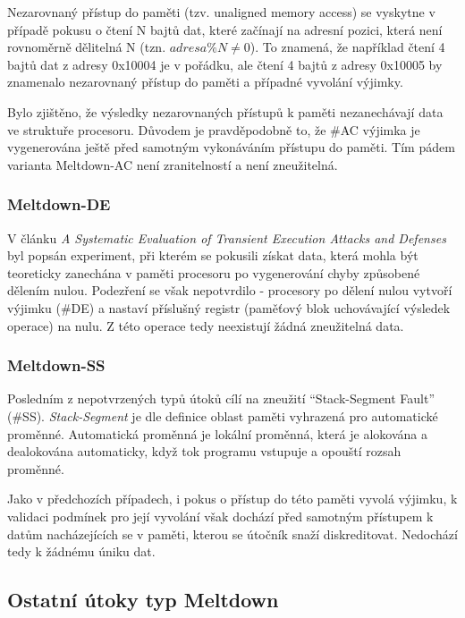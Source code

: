 Nezarovnaný přístup do paměti (tzv. unaligned memory access) se vyskytne v případě pokusu o čtení N bajtů dat, které začínají na adresní pozici, která není rovnoměrně dělitelná N (tzn. \( adresa \% N \neq 0 \)).
To znamená, že například čtení 4 bajtů dat z adresy 0x10004 je v pořádku, ale čtení 4 bajtů z adresy 0x10005 by znamenalo nezarovnaný přístup do paměti a případné vyvolání výjimky.

Bylo zjištěno, že výsledky nezarovnaných přístupů k paměti nezanechávají data ve struktuře procesoru.
Důvodem je pravděpodobně to, že \#AC výjimka je vygenerována ještě před samotným vykonáváním přístupu do paměti.
Tím pádem varianta Meltdown-AC není zranitelností a není zneužitelná.

\subsubsection{Meltdown-DE}

V článku \textit{A Systematic Evaluation of Transient Execution Attacks and Defenses} byl popsán experiment, při kterém se pokusili získat data, která mohla být teoreticky zanechána v paměti procesoru po vygenerování chyby způsobené dělením nulou.
Podezření se však nepotvrdilo - procesory po dělení nulou vytvoří výjimku (\#DE) a nastaví příslušný registr (paměťový blok uchovávající výsledek operace) na nulu.
Z této operace tedy neexistují žádná zneužitelná data.

\subsubsection{Meltdown-SS}

Posledním z nepotvrzených typů útoků cílí na zneužití \enquote{Stack-Segment Fault} (\#SS).
\textit{Stack-Segment} je dle definice oblast paměti vyhrazená pro automatické proměnné.
Automatická proměnná je lokální proměnná, která je alokována a dealokována automaticky, když tok programu vstupuje a opouští rozsah proměnné.

Jako v předchozích případech, i pokus o přístup do této paměti vyvolá výjimku, k validaci podmínek pro její vyvolání však dochází před samotným přístupem k datům nacházejících se v paměti, kterou se útočník snaží diskreditovat.
Nedochází tedy k žádnému úniku dat.

\subsection{Ostatní útoky typ Meltdown}

